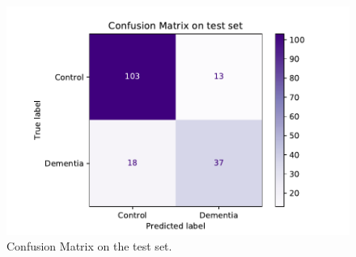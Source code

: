 \begin{figure}
 \centering
 \includegraphics[width=.9\linewidth]{figures/Experiements/Eval/test_confusion_matrix.pdf}
 \captionsetup{width=.9\linewidth}
 \caption[ConfMatrix]{Confusion Matrix on the test set.}
 \label{fig:test_conf_matrix}
\end{figure}


